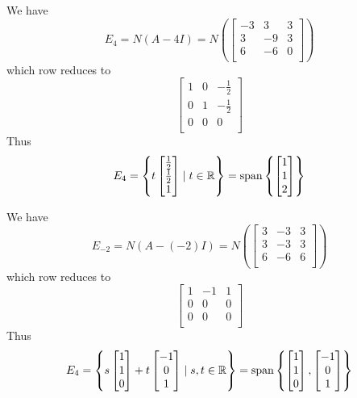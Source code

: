 \documentclass{article}
\DeclareMathOperator{\spn}{span}
\begin{document}
\begin{example}
  We have \[
    E_4 = N(A - 4I) = N\left(
    \begin{bmatrix}
        -3 & 3  & 3 \\
        3  & -9 & 3 \\
        6  & -6 & 0 \\
      \end{bmatrix}\right)
  \] which row reduces to \[
    \begin{bmatrix}
      1 & 0 & -\frac{1}{2} \\
      0 & 1 & -\frac{1}{2} \\
      0 & 0 & 0            \\
    \end{bmatrix}
  \] Thus \[
    E_{4} = \left\{ t
    \begin{bmatrix}
      \frac{1}{2} \\\frac{1}{2}\\1\\
    \end{bmatrix}\mid t \in \R \right\} = \spn \left\{
    \begin{bmatrix}
      1 \\1\\2\\
    \end{bmatrix}\right\}
  \]

  We have \[
    E_{-2} = N(A - (-2)I) = N\left(
    \begin{bmatrix}
        3 & -3 & 3 \\
        3 & -3 & 3 \\
        6 & -6 & 6 \\
      \end{bmatrix}\right)
  \] which row reduces to \[
    \begin{bmatrix}
      1 & -1 & 1 \\
      0 & 0  & 0 \\
      0 & 0  & 0 \\
    \end{bmatrix}
  \] Thus \[
    E_{4} = \left\{ s
    \begin{bmatrix}
      1 \\1\\0\\
    \end{bmatrix} + t
    \begin{bmatrix}
      -1 \\0\\1\\
    \end{bmatrix}\mid s,t \in \R \right\} = \spn \left\{
    \begin{bmatrix}
      1 \\1\\0\\
    \end{bmatrix},
    \begin{bmatrix}
      -1 \\0\\1\\
    \end{bmatrix}\right\}
  \]
\end{example}
\end{document}
